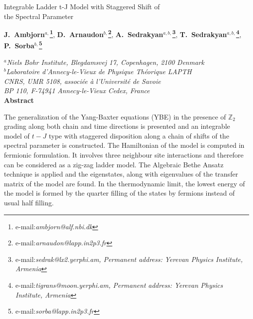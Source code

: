 \documentclass[a4paper,12pt]{article}
\def\ZZ{{\mathbb Z}}
\begin{document}
\pagestyle{empty}

\begin{center} 
  {\Large \textsf{
      Integrable Ladder t-J Model with Staggered Shift of                    
      \\[4mm]
      the Spectral Parameter}} 
  
\vspace{36pt}
{\bf J.~Ambjorn$^{a,}$\footnote{e-mail:{\sl ambjorn@alf.nbi.dk}}},
{\bf D.~Arnaudon$^{b,}$\footnote{e-mail:{\sl arnaudon@lapp.in2p3.fr}}},
{\bf A.~Sedrakyan$^{a,b,}$\footnote{e-mail:{\sl sedrak@lx2.yerphi.am,
Permanent address: Yerevan Physics Institute, Armenia}}},
{\bf T.~Sedrakyan$^{a,b,}$\footnote{e-mail:{\sl tigrans@moon.yerphi.am,
Permanent address: Yerevan Physics Institute, Armenia}}},
{\bf P.~Sorba$^{b,}$\footnote{e-mail:{\sl sorba@lapp.in2p3.fr}}}\\  


\vfill

\emph{$^a$Niels Bohr Institute, Blegdamsvej 17, Copenhagen, 2100 Denmark}
\\[4mm]
\emph{$^b$Laboratoire d'Annecy-le-Vieux de Physique Th{\'e}orique LAPTH}
\\
\emph{CNRS, UMR 5108, associ{\'e}e {\`a} l'Universit{\'e} de Savoie}
\\
\emph{BP 110, F-74941 Annecy-le-Vieux Cedex, France}
\\

\vfill
{\bf Abstract}

\end{center}

The generalization of the Yang-Baxter equations (YBE) in the presence
of $\ZZ_2$ grading along both chain and time directions is presented
and an integrable model of $t-J$ type 
with staggered disposition along a chain of shifts of the spectral 
parameter is constructed. The Hamiltonian of the model is computed in 
fermionic formulation. It involves three neighbour site interactions
and therefore can be considered as a zig-zag ladder model. The Algebraic
Bethe Ansatz technique is applied and the eigenstates, along with
eigenvalues of the transfer matrix of the model are found.
In the thermodynamic limit, the lowest energy of the
model is formed by the quarter filling of the states by fermions
instead of usual half filling.

\vfill
{}

\newpage
\pagestyle{plain}
\setcounter{page}{1}
\end{document}
